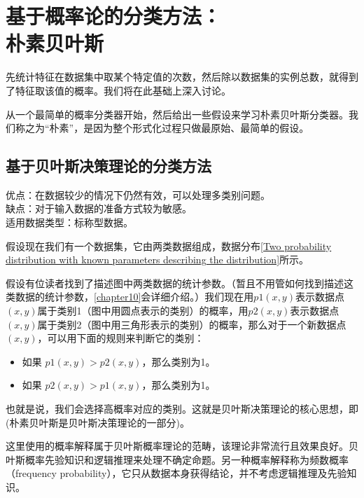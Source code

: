\chapter{基于概率论的分类方法：\\
  朴素贝叶斯\label{chapter04}}
先统计特征在数据集中取某个特定值的次数，然后除以数据集的实例总数，就得到了特征取该值的概率。我们将在此基础上深入讨论。

从一个最简单的概率分类器开始，然后给出一些假设来学习朴素贝叶斯分类器。我们称之为“朴素”，是因为整个形式化过程只做最原始、最简单的假设。
\section{基于贝叶斯决策理论的分类方法}
\begin{tcolorbox}[title=朴素贝叶斯]
    优点：在数据较少的情况下仍然有效，可以处理多类别问题。\\
    缺点：对于输入数据的准备方式较为敏感。\\
    适用数据类型：标称型数据。
\end{tcolorbox}



假设现在我们有一个数据集，它由两类数据组成，数据分布\autoref{Two probability distribution with known parameters describing the distribution}所示。

假设有位读者找到了描述图中两类数据的统计参数。（暂且不用管如何找到描述这类数据的统计参数，\autoref{chapter10}会详细介绍。）我们现在用$p1(x,y)$表示数据点$(x,y)$属于类别1（图中用圆点表示的类别）的概率，用$p2(x,y)$表示数据点$(x,y)$属于类别2（图中用三角形表示的类别）的概率，那么对于一个新数据点$(x,y)$，可以用下面的规则来判断它的类别：
\begin{itemize}
    \item 如果 $p1(x,y) > p2(x,y)$，那么类别为1。
    \item 如果 $p2(x,y) > p1(x,y)$，那么类别为1。
\end{itemize}
也就是说，我们会选择高概率对应的类别。这就是贝叶斯决策理论的核心思想，即(朴素贝叶斯是贝叶斯决策理论的一部分)。

\begin{tcolorbox}[title=贝叶斯？]
    这里使用的概率解释属于贝叶斯概率理论的范畴，该理论非常流行且效果良好。贝叶斯概率先验知识和逻辑推理来处理不确定命题。另一种概率解释称为频数概率（frequency probability），它只从数据本身获得结论，并不考虑逻辑推理及先验知识。
\end{tcolorbox}